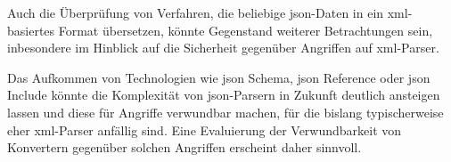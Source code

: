 Auch die Überprüfung von Verfahren, die beliebige \acrshort{json}-Daten in ein \acrshort{xml}-basiertes Format übersetzen, könnte Gegenstand weiterer Betrachtungen sein, inbesondere im Hinblick auf die Sicherheit gegenüber Angriffen auf \acrshort{xml}-Parser.

Das Aufkommen von Technologien wie \acrshort{json} Schema, \acrshort{json} Reference oder \acrshort{json} Include könnte die Komplexität von \acrshort{json}-Parsern in Zukunft deutlich ansteigen lassen und diese für Angriffe verwundbar machen, für die bislang typischerweise eher \acrshort{xml}-Parser anfällig sind. Eine Evaluierung der Verwundbarkeit von Konvertern gegenüber solchen Angriffen erscheint daher sinnvoll.
